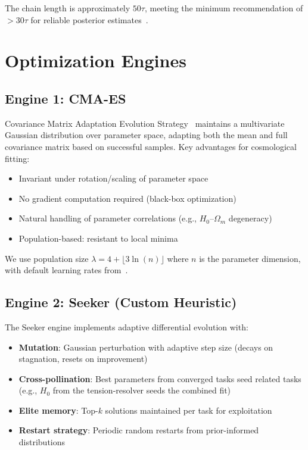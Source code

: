 \documentclass[twocolumn,showpacs,preprintnumbers,amsmath,amssymb,prl]{revtex4-2}
\begin{document}
The chain length is approximately $50\tau$, meeting the minimum recommendation of $>30\tau$ for reliable posterior estimates~\cite{Foreman-Mackey2013}.

\section{Optimization Engines}

\subsection{Engine 1: CMA-ES}

Covariance Matrix Adaptation Evolution Strategy~\cite{Hansen2001} maintains a multivariate Gaussian distribution over parameter space, adapting both the mean and full covariance matrix based on successful samples. Key advantages for cosmological fitting:
\begin{itemize}
\item Invariant under rotation/scaling of parameter space
\item No gradient computation required (black-box optimization)
\item Natural handling of parameter correlations (e.g., $H_0$--$\Omega_m$ degeneracy)
\item Population-based: resistant to local minima
\end{itemize}

We use population size $\lambda = 4 + \lfloor 3\ln(n) \rfloor$ where $n$ is the parameter dimension, with default learning rates from~\cite{Hansen2001}.

\subsection{Engine 2: Seeker (Custom Heuristic)}

The Seeker engine implements adaptive differential evolution with:
\begin{itemize}
\item \textbf{Mutation}: Gaussian perturbation with adaptive step size (decays on stagnation, resets on improvement)
\item \textbf{Cross-pollination}: Best parameters from converged tasks seed related tasks (e.g., $H_0$ from the tension-resolver seeds the combined fit)
\item \textbf{Elite memory}: Top-$k$ solutions maintained per task for exploitation
\item \textbf{Restart strategy}: Periodic random restarts from prior-informed distributions
\end{itemize}
\end{document}
